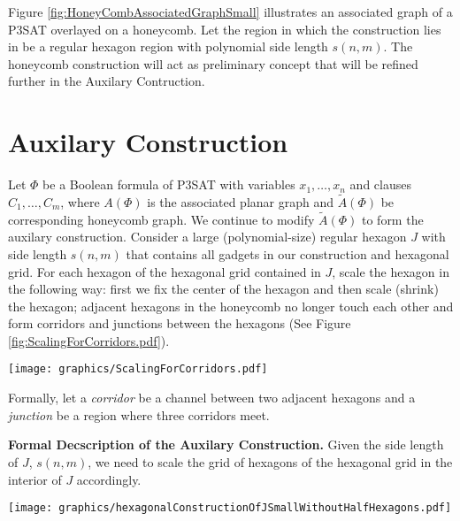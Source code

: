 \documentclass[10pt]{CSUNthesis}
\theoremstyle{plain}%
\theoremstyle{definition}
\theoremstyle{remark}
\newcommand{\lr}[1]{\left( #1 \right)}
\begin{document}
Figure \ref{fig:HoneyCombAssociatedGraphSmall} illustrates an associated graph of a P3SAT overlayed on a honeycomb.
Let the region in which the construction lies in be a regular hexagon region with polynomial side length $s(n,m)$. 
The honeycomb construction will act as preliminary concept that will be refined further in the Auxilary Contruction.\section{Auxilary Construction}\label{sec:auxiliaryConstruction}
Let $\Phi$ be a Boolean formula of P3SAT with variables $x_1,\ldots , x_n$ and clauses $C_1,\ldots ,C_m$, where $A(\Phi)$ is the associated planar graph and $\tilde{A}\lr{\Phi}$ be corresponding honeycomb graph.
We continue to modify $\tilde{A}\lr{\Phi}$ to form the auxilary construction.   
Consider a large (polynomial-size) regular hexagon $J$  with side length $s(n,m)$ that contains all gadgets in our construction and hexagonal grid.
For each hexagon of the hexagonal grid contained in $J$, scale the hexagon in the following way: first we fix the center of the hexagon and then scale (shrink) the hexagon; adjacent hexagons in the honeycomb no longer touch each other and form corridors and junctions between the hexagons (See Figure \ref{fig:ScalingForCorridors.pdf}). 

\begin{minipage}{\linewidth}
\begin{center}
\texttt{[image: graphics/ScalingForCorridors.pdf]}
\label{fig:ScalingForCorridors.pdf}
\end{center}
\end{minipage}

Formally, let a \textit{corridor} be a channel between two adjacent hexagons and a \textit{junction} be a region where three corridors meet.

\textbf{Formal Decscription of the Auxilary Construction.}
Given the side length of $J$, $s(n,m)$, we need to scale the grid of hexagons of the hexagonal grid in the interior of $J$ accordingly.

\begin{minipage}{\linewidth}
\begin{center}
\texttt{[image: graphics/hexagonalConstructionOfJSmallWithoutHalfHexagons.pdf]}
\label{fig:hexagonalConstructionOfJSmallWithoutHalfHexagons.pdf}
\end{center}
\end{minipage}
\end{document}
